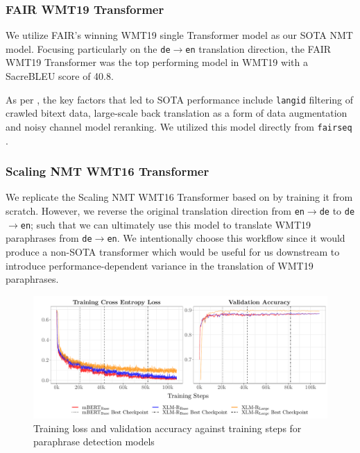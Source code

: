 \documentclass[11pt,a4paper]{article}
\begin{document}
\subsubsection{FAIR WMT19 Transformer}

We utilize FAIR's winning WMT19 single Transformer model as our SOTA NMT model. Focusing particularly on the \texttt{de$\rightarrow$en} translation direction, the FAIR WMT19 Transformer was the top performing model in WMT19 with a SacreBLEU \cite{post-2018-call} score of 40.8.

As per \citet{ng2019facebook}, the key factors that led to SOTA performance include \texttt{langid} filtering of crawled bitext data, large-scale back translation as a form of data augmentation and noisy channel model reranking. We utilized this model directly from \texttt{fairseq} \cite{ott2019fairseq}. 

\subsubsection{Scaling NMT WMT16 Transformer}

We replicate the Scaling NMT WMT16 Transformer based on \citet{ott2018scaling} by training it from scratch. However, we reverse the original translation direction from \texttt{en$\rightarrow$de} to \texttt{de$\rightarrow$en}; such that we can ultimately use this model to translate WMT19 paraphrases from \texttt{de$\rightarrow$en}. We intentionally choose this workflow since it would produce a non-SOTA transformer which would be useful for us downstream to introduce performance-dependent variance in the translation of WMT19 paraphrases.

\begin{figure}
  \centering 
  \includegraphics[trim={0.7cm 0cm 0cm 0cm},clip,width=\textwidth]{paraphrase_detection_models_evolution.pdf}
  \caption{Training loss and validation accuracy against training steps for paraphrase detection models}
  \label{paraphrase_detection_model_evolution}
\end{figure}
\end{document}
